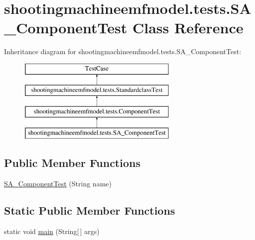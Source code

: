 \hypertarget{classshootingmachineemfmodel_1_1tests_1_1_s_a___component_test}{\section{shootingmachineemfmodel.\-tests.\-S\-A\-\_\-\-Component\-Test Class Reference}
\label{classshootingmachineemfmodel_1_1tests_1_1_s_a___component_test}
}
Inheritance diagram for shootingmachineemfmodel.\-tests.\-S\-A\-\_\-\-Component\-Test\-:\begin{figure}[H]
\begin{center}
\leavevmode
\includegraphics[height=4.000000cm]{classshootingmachineemfmodel_1_1tests_1_1_s_a___component_test}
\end{center}
\end{figure}
\subsection*{Public Member Functions}
\begin{DoxyCompactItemize}
\item 
\hyperlink{classshootingmachineemfmodel_1_1tests_1_1_s_a___component_test_afe923a0ef10b9872336695056a058da3}{S\-A\-\_\-\-Component\-Test} (String name)
\end{DoxyCompactItemize}
\subsection*{Static Public Member Functions}
\begin{DoxyCompactItemize}
\item 
static void \hyperlink{classshootingmachineemfmodel_1_1tests_1_1_s_a___component_test_abab6a9f28a16e000a9c224d476db4dd8}{main} (String\mbox{[}$\,$\mbox{]} args)
\end{DoxyCompactItemize}
